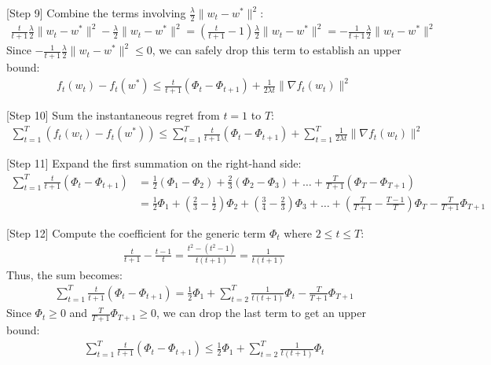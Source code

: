 \documentclass{article}
\begin{document}
[Step 9] Combine the terms involving $\frac{\lambda}{2} \|w_t - w^*\|^2$:
\begin{align*}
\frac{t}{t+1} \frac{\lambda}{2} \|w_t - w^*\|^2 - \frac{\lambda}{2} \|w_t - w^*\|^2 = \left( \frac{t}{t+1} - 1 \right) \frac{\lambda}{2} \|w_t - w^*\|^2 = -\frac{1}{t+1} \frac{\lambda}{2} \|w_t - w^*\|^2
\end{align*}
Since $-\frac{1}{t+1} \frac{\lambda}{2} \|w_t - w^*\|^2 \leq 0$, we can safely drop this term to establish an upper bound:
\begin{align*}
f_t(w_t) - f_t(w^*) \leq \frac{t}{t+1} \left( \Phi_t - \Phi_{t+1} \right) + \frac{1}{2\lambda t} \|\nabla f_t(w_t)\|^2
\end{align*}

[Step 10] Sum the instantaneous regret from $t=1$ to $T$:
\begin{align*}
\sum_{t=1}^T \left( f_t(w_t) - f_t(w^*) \right) \leq \sum_{t=1}^T \frac{t}{t+1} \left( \Phi_t - \Phi_{t+1} \right) + \sum_{t=1}^T \frac{1}{2\lambda t} \|\nabla f_t(w_t)\|^2
\end{align*}

[Step 11] Expand the first summation on the right-hand side:
\begin{align*}
\sum_{t=1}^T \frac{t}{t+1} \left( \Phi_t - \Phi_{t+1} \right) &= \frac{1}{2}(\Phi_1 - \Phi_2) + \frac{2}{3}(\Phi_2 - \Phi_3) + \dots + \frac{T}{T+1}(\Phi_T - \Phi_{T+1}) \\
&= \frac{1}{2}\Phi_1 + \left(\frac{2}{3} - \frac{1}{2}\right)\Phi_2 + \left(\frac{3}{4} - \frac{2}{3}\right)\Phi_3 + \dots + \left(\frac{T}{T+1} - \frac{T-1}{T}\right)\Phi_T - \frac{T}{T+1}\Phi_{T+1}
\end{align*}

[Step 12] Compute the coefficient for the generic term $\Phi_t$ where $2 \leq t \leq T$:
\begin{align*}
\frac{t}{t+1} - \frac{t-1}{t} = \frac{t^2 - (t^2 - 1)}{t(t+1)} = \frac{1}{t(t+1)}
\end{align*}
Thus, the sum becomes:
\begin{align*}
\sum_{t=1}^T \frac{t}{t+1} \left( \Phi_t - \Phi_{t+1} \right) = \frac{1}{2}\Phi_1 + \sum_{t=2}^T \frac{1}{t(t+1)} \Phi_t - \frac{T}{T+1}\Phi_{T+1}
\end{align*}
Since $\Phi_t \geq 0$ and $\frac{T}{T+1}\Phi_{T+1} \geq 0$, we can drop the last term to get an upper bound:
\begin{align*}
\sum_{t=1}^T \frac{t}{t+1} \left( \Phi_t - \Phi_{t+1} \right) \leq \frac{1}{2}\Phi_1 + \sum_{t=2}^T \frac{1}{t(t+1)} \Phi_t
\end{align*}
\end{document}
